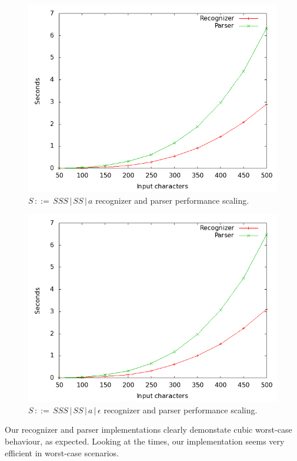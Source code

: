 \documentclass[a4paper,10pt]{article}
\begin{document}
\begin{figure}[H]
\centering
\includegraphics[scale=0.4]{worst-case.png}
\caption{$S\,::=\,SSS\,|\,SS\,|\,a$ recognizer and parser performance scaling.}
\end{figure}

\begin{figure}[H]
\centering
\includegraphics[scale=0.4]{worst-case_with-epsilon.png}
\caption{$S\,::=\,SSS\,|\,SS\,|\,a\,|\,\epsilon$ recognizer and parser performance scaling.}
\end{figure}

Our recognizer and parser implementations clearly demonstate cubic worst-case behaviour, as expected. Looking at the times, our implementation seems very efficient in worst-case scenarios.
\end{document}
